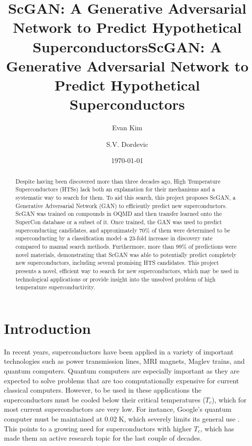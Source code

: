 \title{ScGAN: A Generative Adversarial Network to Predict Hypothetical Superconductors}



\title{ScGAN: A Generative Adversarial Network to Predict Hypothetical Superconductors}
\date{\today}

\author{Evan Kim}
 
 \author{S.V. Dordevic}

\begin{abstract}
Despite having been discovered more than three decades ago, High Temperature Superconductors (HTSs) lack both an explanation for their mechanisms and a systematic way to search for them. To aid this search, this project proposes ScGAN, a Generative Adversarial Network (GAN) to efficiently predict new superconductors. ScGAN was trained on compounds in OQMD and then transfer learned onto the SuperCon database or a subset of it. Once trained, the GAN was used to predict superconducting candidates, and approximately 70\% of them were determined to be superconducting by a classification model--a 23-fold increase in discovery rate compared to manual search methods. Furthermore, more than 99\% of predictions were novel materials, demonstrating that ScGAN was able to potentially predict completely new superconductors, including several promising HTS candidates. This project presents a novel, efficient way to search for new superconductors, which may be used in technological applications or provide insight into the unsolved problem of high temperature superconductivity.
\end{abstract}

\maketitle

\section{Introduction}
\label{introduction}

In recent years, superconductors have been applied in a variety of important technologies such as power transmission lines, MRI magnets, Maglev trains, and quantum computers. Quantum computers are especially important as they are expected to solve problems that are too computationally expensive for current classical computers. However, to be used in these applications the superconductors must be cooled below their critical temperatures ($T_c$), which for most current superconductors are very low. For instance, Google's quantum computer must be maintained at $0.02 \;\mathrm{K}$, which severely limits its general use \cite{Arute2019}. This points to a growing need for superconductors with higher $T_c$, 
which has made them an active research topic for the last couple of decades. 


